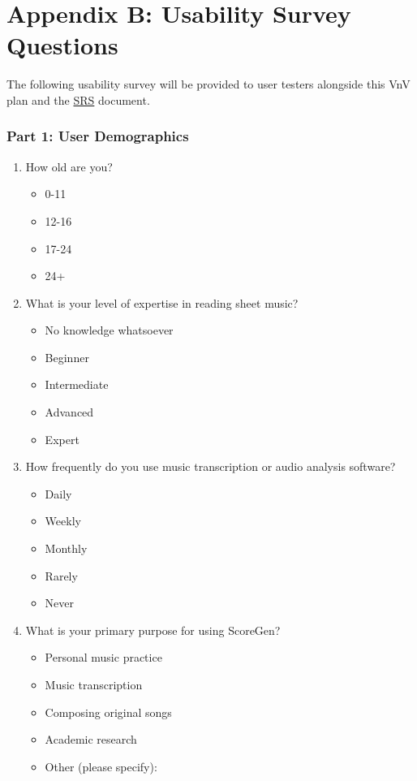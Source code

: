 \documentclass[12pt, titlepage]{article}
\begin{document}
\section*{Appendix B: Usability Survey Questions}
The following usability survey will be provided to user testers alongside 
this VnV plan and the \href{https://github.com/emilyperica/ScoreGen/blob/main/docs/SRS-Volere/SRS.pdf}{SRS} document.

\subsubsection*{Part 1: User Demographics}
\begin{enumerate}[leftmargin=*]
  \item How old are you?
  \begin{itemize}
    \item 0-11
    \item 12-16
    \item 17-24
    \item 24+
  \end{itemize}
  \item What is your level of expertise in reading sheet music? 
  \begin{itemize}
    \item No knowledge whatsoever
    \item Beginner
    \item Intermediate
    \item Advanced
    \item Expert
  \end{itemize}
  \item How frequently do you use music transcription or audio analysis software?
  \begin{itemize}
    \item Daily
    \item Weekly
    \item Monthly
    \item Rarely
    \item Never
  \end{itemize}
  \item What is your primary purpose for using ScoreGen?
  \begin{itemize}
    \item Personal music practice
    \item Music transcription
    \item Composing original songs
    \item Academic research
    \item Other (please specify): \hrulefill
  \end{itemize}
\end{enumerate}
\end{document}
